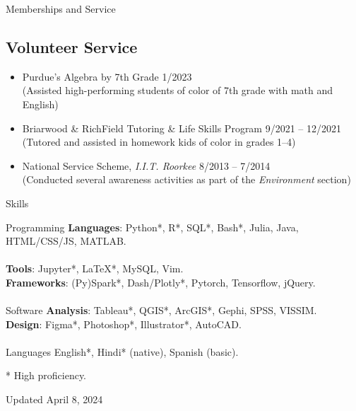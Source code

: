 \documentclass{CV} %
\begin{document}
\begin{rSection}{Memberships and Service}
    \subsection*{Volunteer Service}
    \begin{itemize}
        \item Purdue's Algebra by 7th Grade \hfill 1/2023
        \\ (Assisted high-performing students of color of 7th grade with math and English)
        \item Briarwood \& RichField Tutoring \& Life Skills Program \hfill 9/2021 – 12/2021
        \\ (Tutored and assisted in homework kids of color in grades 1–4)
        \item National Service Scheme, \textit{I.I.T. Roorkee} \hfill 8/2013 – 7/2014
        \\ (Conducted several awareness activities as part of the \textit{Environment} section)
    \end{itemize}

\end{rSection}

\begin{rSection}{Skills}
    \begin{tabbing}
    Programming \hspace*{0.5cm} \= \textbf{Languages}: Python*, R*, SQL*, Bash*, Julia, Java, HTML/CSS/JS, MATLAB. \\
    \\ \> \textbf{Tools}: Jupyter*, LaTeX*, MySQL, Vim.
    \\ \> \textbf{Frameworks}: (Py)Spark*, Dash/Plotly*, Pytorch, Tensorflow, jQuery. \\

    \\ Software
       \> \textbf{Analysis}: Tableau*, QGIS*, ArcGIS*, Gephi, SPSS, VISSIM.
    \\ \> \textbf{Design}: Figma*, Photoshop*, Illustrator*, AutoCAD. \\
    \\ Languages \> English*, Hindi* (native), Spanish (basic).
    \end{tabbing}
    * High proficiency.
\end{rSection}

\vspace*{\fill}
\centering Updated April 8, 2024
\end{document}
